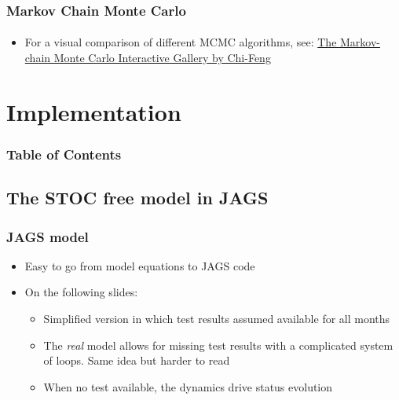 \documentclass{beamer}
\begin{document}
\begin{frame}
\frametitle{Markov Chain Monte Carlo}
\framesubtitle{}

\begin{itemize}
 \item{For a visual comparison of different MCMC algorithms, see: \href{http://chi-feng.github.io/mcmc-demo/}{The Markov-chain Monte Carlo Interactive Gallery by Chi-Feng}}
\end{itemize}
\end{frame}

\section{Implementation}
\begin{frame}
\frametitle{Table of Contents}
  \tableofcontents[currentsection]
\end{frame} 

\subsection[JAGS]{The STOC free model in JAGS}

\begin{frame}
\frametitle{JAGS model}
\begin{itemize}
 \item{Easy to go from model equations to JAGS code}
 \item{On the following slides:}
 \begin{itemize}
  \item{Simplified version in which test results assumed available for all months}
  \item{The \emph{real} model allows for missing test results with a complicated system of loops. Same idea but harder to read}
  \item{When no test available, the dynamics drive status evolution}
 \end{itemize}
\end{itemize}
\end{frame}
\end{document}
